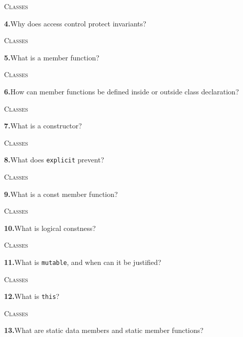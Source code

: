 \documentclass[11pt,a4paper]{article}
\newenvironment{questionblock}{%
  \begin{minipage}[t][0.455\textheight][t]{\textwidth}%
  \raggedright\small
}{%
  \vfill
  \end{minipage}%
}
\newcommand{\sectionlabel}[1]{\textsc{#1}\par\vspace{0.35em}}
\newcommand{\questionnumber}[1]{\textbf{#1.}\enspace}
\begin{document}
\newpage
\begin{questionblock}
\sectionlabel{Classes}
\questionnumber{4}Why does access control protect invariants?\par
\end{questionblock}
\vspace*{0.04\textheight}
\begin{questionblock}
\sectionlabel{Classes}
\questionnumber{5}What is a member function?\par
\end{questionblock}
\newpage
\begin{questionblock}
\sectionlabel{Classes}
\questionnumber{6}How can member functions be defined inside or outside class declaration?\par
\end{questionblock}
\vspace*{0.04\textheight}
\begin{questionblock}
\sectionlabel{Classes}
\questionnumber{7}What is a constructor?\par
\end{questionblock}
\newpage
\begin{questionblock}
\sectionlabel{Classes}
\questionnumber{8}What does \verb|explicit| prevent?\par
\end{questionblock}
\vspace*{0.04\textheight}
\begin{questionblock}
\sectionlabel{Classes}
\questionnumber{9}What is a const member function?\par
\end{questionblock}
\newpage
\begin{questionblock}
\sectionlabel{Classes}
\questionnumber{10}What is logical constness?\par
\end{questionblock}
\vspace*{0.04\textheight}
\begin{questionblock}
\sectionlabel{Classes}
\questionnumber{11}What is \verb|mutable|, and when can it be justified?\par
\end{questionblock}
\newpage
\begin{questionblock}
\sectionlabel{Classes}
\questionnumber{12}What is \verb|this|?\par
\end{questionblock}
\vspace*{0.04\textheight}
\begin{questionblock}
\sectionlabel{Classes}
\questionnumber{13}What are static data members and static member functions?\par
\end{questionblock}
\end{document}
